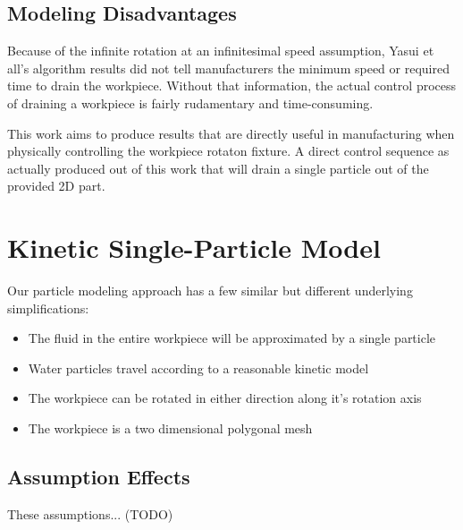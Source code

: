 	\subsection{Modeling Disadvantages}

Because of the infinite rotation at an infinitesimal speed assumption, Yasui et all's algorithm results did not tell manufacturers the minimum speed or required time to drain the workpiece. Without that information, the actual control process of draining a workpiece is fairly rudamentary and time-consuming.

This work aims to produce results that are directly useful in manufacturing when physically controlling the workpiece rotaton fixture. A direct control sequence as actually produced out of this work that will drain a single particle out of the provided 2D part.

\section{Kinetic Single-Particle Model}

Our particle modeling approach has a few similar but different underlying simplifications:

\begin{itemize}
	\item The fluid in the entire workpiece will be approximated by a single particle
	\item Water particles travel according to a reasonable kinetic model
	\item The workpiece can be rotated in either direction along it's rotation axis
	\item The workpiece is a two dimensional polygonal mesh
\end{itemize}

	\subsection{Assumption Effects}

These assumptions... (TODO)
